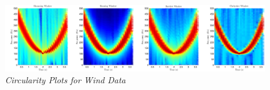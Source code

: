 \documentclass[./main.tex]{subfiles}
\begin{document}
\begin{figure}[h]
	\centering 
	\includegraphics[scale=0.45]{fig/2/2_3_a_windows.pdf}
	\caption{\textit{Circularity Plots for Wind Data}}
	\label{fig:}
\end{figure}
%
%
\end{document}
